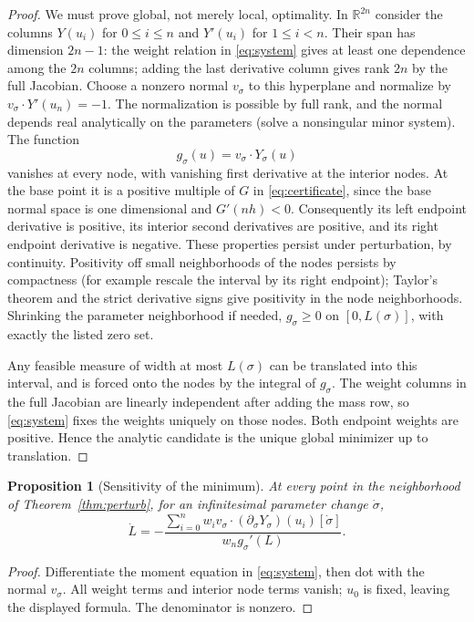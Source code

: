 \documentclass[11pt]{article}
\newtheorem{proposition}[theorem]{Proposition}
\theoremstyle{remark}\newtheorem{remark}[theorem]{Remark}
\newcommand{\R}{\mathbb R}\newcommand{\C}{\mathbb C}\newcommand{\supp}{\operatorname{supp}}
\begin{document}
\begin{proof}
We must prove global, not merely local, optimality. In $\R^{2n}$ consider the columns $Y(u_i)$ for $0\le i\le n$ and $Y'(u_i)$ for $1\le i<n$. Their span has dimension $2n-1$: the weight relation in \eqref{eq:system} gives at least one dependence among the $2n$ columns; adding the last derivative column gives rank $2n$ by the full Jacobian. Choose a nonzero normal $v_\sigma$ to this hyperplane and normalize by $v_\sigma\cdot Y'(u_n)=-1$. The normalization is possible by full rank, and the normal depends real analytically on the parameters (solve a nonsingular minor system). The function
\[
 g_\sigma(u)=v_\sigma\cdot Y_\sigma(u)
\]
vanishes at every node, with vanishing first derivative at the interior nodes. At the base point it is a positive multiple of $G$ in \eqref{eq:certificate}, since the base normal space is one dimensional and $G'(nh)<0$. Consequently its left endpoint derivative is positive, its interior second derivatives are positive, and its right endpoint derivative is negative. These properties persist under perturbation, by continuity. Positivity off small neighborhoods of the nodes persists by compactness (for example rescale the interval by its right endpoint); Taylor's theorem and the strict derivative signs give positivity in the node neighborhoods. Shrinking the parameter neighborhood if needed, $g_\sigma\ge0$ on $[0,L(\sigma)]$, with exactly the listed zero set.

Any feasible measure of width at most $L(\sigma)$ can be translated into this interval, and is forced onto the nodes by the integral of $g_\sigma$. The weight columns in the full Jacobian are linearly independent after adding the mass row, so \eqref{eq:system} fixes the weights uniquely on those nodes. Both endpoint weights are positive. Hence the analytic candidate is the unique global minimizer up to translation.
\end{proof}

\begin{proposition}[Sensitivity of the minimum]\label{prop:sense}
At every point in the neighborhood of Theorem~\ref{thm:perturb}, for an infinitesimal parameter change $\dot\sigma$,
\begin{equation}\label{eq:sense}
 \dot L=-\frac{\sum_{i=0}^n w_i v_\sigma\cdot (\partial_\sigma Y_\sigma)(u_i)[\dot\sigma]}
                    {w_n g_\sigma'(L)}.
\end{equation}
\end{proposition}
\begin{proof}
Differentiate the moment equation in \eqref{eq:system}, then dot with the normal $v_\sigma$. All weight terms and interior node terms vanish; $u_0$ is fixed, leaving the displayed formula. The denominator is nonzero.
\end{proof}
\end{document}
